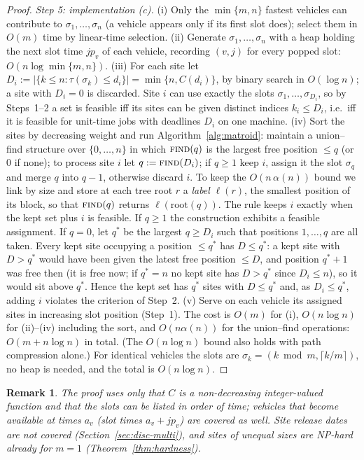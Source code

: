 \documentclass[pdflatex,sn-mathphys-ay]{sn-jnl}
\theoremstyle{thmstyleone}
\theoremstyle{thmstyletwo}
\newtheorem{remark}{Remark}
\theoremstyle{thmstylethree}
\begin{document}
\begin{proof}
\emph{Step 5: implementation (c).} (i) Only the $\min\{m,n\}$ fastest
vehicles can contribute to $\sigma_1,\dots,\sigma_n$ (a vehicle appears
only if its first slot does); select them in $O(m)$ time by linear-time selection. (ii) Generate
$\sigma_1,\dots,\sigma_n$ with a heap holding the next slot time $jp_v$
of each vehicle, recording $(v,j)$ for every popped slot:
$O(n\log\min\{m,n\})$. (iii) For each site let $D_i:=|\{k\le n:\tau(\sigma_k)\le d_i\}|
=\min\{n,C(d_i)\}$, by binary search in $O(\log n)$; a site with $D_i=0$ is
discarded. Site $i$ can use exactly the slots $\sigma_1,\dots,\sigma_{D_i}$,
so by Steps~1--2 a set is feasible iff its sites can be given distinct
indices $k_i\le D_i$, i.e.\ iff it is feasible for unit-time jobs with
deadlines $D_i$ on one machine. (iv) Sort the sites by decreasing weight
and run Algorithm~\ref{alg:matroid}: maintain a union--find structure over
$\{0,\dots,n\}$ in which $\textsc{find}(q)$ is the largest free position
$\le q$ (or $0$ if none); to process site $i$ let $q:=\textsc{find}(D_i)$;
if $q\ge1$ keep $i$, assign it the slot $\sigma_q$ and merge $q$ into
$q-1$, otherwise discard $i$. To keep the $O(n\,\alpha(n))$ bound we link
by size and store at each tree root $r$ a \emph{label} $\ell(r)$, the
smallest position of its block, so that $\textsc{find}(q)$ returns
$\ell(\mathrm{root}(q))$. The rule keeps $i$ exactly when the kept set plus
$i$ is feasible. If $q\ge1$ the construction exhibits a feasible
assignment. If $q=0$, let $q^\ast$ be the largest $q\ge D_i$ such that
positions $1,\dots,q$ are all taken. Every kept site occupying a position
$\le q^\ast$ has $D\le q^\ast$: a kept site with $D>q^\ast$ would have
been given the latest free position $\le D$, and position $q^\ast+1$ was
free then (it is free now; if $q^\ast=n$ no kept site has $D>q^\ast$
since $D_i\le n$), so it would sit above $q^\ast$. Hence the kept set has
$q^\ast$ sites with $D\le q^\ast$ and, as $D_i\le q^\ast$, adding $i$
violates the criterion of Step~2. (v) Serve on each vehicle its assigned
sites in increasing slot position (Step~1). The cost is $O(m)$ for (i),
$O(n\log n)$ for (ii)--(iv) including the sort, and $O(n\alpha(n))$ for
the union--find operations: $O(m+n\log n)$ in total. (The $O(n\log n)$
bound also holds with path compression alone.) For identical vehicles the
slots are $\sigma_k=(k\bmod m,\lceil k/m\rceil)$, no heap is needed, and
the total is $O(n\log n)$.
\end{proof}

\begin{remark}
The proof uses only that $C$ is a non-decreasing integer-valued function
and that the slots can be listed in order of time; vehicles that become
available at times $a_v$ (slot times $a_v+jp_v$) are covered as well. Site
release dates are \emph{not} covered (Section~\ref{sec:disc-multi}), and
sites of unequal sizes are NP-hard already for $m=1$
(Theorem~\ref{thm:hardness}).
\end{remark}
\end{document}
